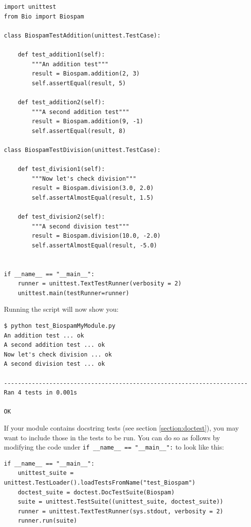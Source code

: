 \documentclass{report}
\begin{document}
\begin{itemize}
\begin{verbatim}
import unittest
from Bio import Biospam

class BiospamTestAddition(unittest.TestCase):

    def test_addition1(self):
        """An addition test"""
        result = Biospam.addition(2, 3)
        self.assertEqual(result, 5)

    def test_addition2(self):
        """A second addition test"""
        result = Biospam.addition(9, -1)
        self.assertEqual(result, 8)

class BiospamTestDivision(unittest.TestCase):

    def test_division1(self):
        """Now let's check division"""
        result = Biospam.division(3.0, 2.0)
        self.assertAlmostEqual(result, 1.5)

    def test_division2(self):
        """A second division test"""
        result = Biospam.division(10.0, -2.0)
        self.assertAlmostEqual(result, -5.0)


if __name__ == "__main__":
    runner = unittest.TextTestRunner(verbosity = 2)
    unittest.main(testRunner=runner)
\end{verbatim}

        Running the script will now show you:

\begin{verbatim}
$ python test_BiospamMyModule.py
An addition test ... ok
A second addition test ... ok
Now let's check division ... ok
A second division test ... ok

----------------------------------------------------------------------
Ran 4 tests in 0.001s

OK
\end{verbatim}
\end{itemize}

If your module contains docstring tests (see section \ref{section:doctest}),
you may want to include those in the tests to be run. You can do so as
follows by modifying the code under \verb|if __name__ == "__main__":|
to look like this:

\begin{verbatim}
if __name__ == "__main__":
    unittest_suite = unittest.TestLoader().loadTestsFromName("test_Biospam")
    doctest_suite = doctest.DocTestSuite(Biospam)
    suite = unittest.TestSuite((unittest_suite, doctest_suite))
    runner = unittest.TextTestRunner(sys.stdout, verbosity = 2)
    runner.run(suite)
\end{verbatim}
\end{document}
